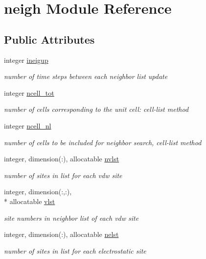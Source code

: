 \hypertarget{classneigh}{\section{neigh Module Reference}
\label{classneigh}
}
\subsection*{Public Attributes}
\begin{DoxyCompactItemize}
\item 
integer \hyperlink{classneigh_a91014fd28ce5849e5f8665c6b4d6f100}{ineigup}
\begin{DoxyCompactList}\small\item\em number of time steps between each neighbor list update \end{DoxyCompactList}\item 
integer \hyperlink{classneigh_a207a01b850afbc2b58c02b480cb7018e}{ncell\-\_\-tot}
\begin{DoxyCompactList}\small\item\em number of cells corresponding to the unit cell\-: cell-\/list method \end{DoxyCompactList}\item 
integer \hyperlink{classneigh_a26e26aed27268acd9f2dc587f89a4bcc}{ncell\-\_\-nl}
\begin{DoxyCompactList}\small\item\em number of cells to be included for neighbor search, cell-\/list method \end{DoxyCompactList}\item 
integer, dimension(\-:), allocatable \hyperlink{classneigh_ab1ecf3ee54d3ed5950574b699190e028}{nvlst}
\begin{DoxyCompactList}\small\item\em number of sites in list for each vdw site \end{DoxyCompactList}\item 
integer, dimension(\-:,\-:), \\*
allocatable \hyperlink{classneigh_adecf1389089b0ed25f60e40cefba27fd}{vlst}
\begin{DoxyCompactList}\small\item\em site numbers in neighbor list of each vdw site \end{DoxyCompactList}\item 
integer, dimension(\-:), allocatable \hyperlink{classneigh_af262864038c308dd317cf32e78609ecd}{nelst}
\begin{DoxyCompactList}\small\item\em number of sites in list for each electrostatic site \end{DoxyCompactList}\item 

\end{DoxyCompactItemize}
